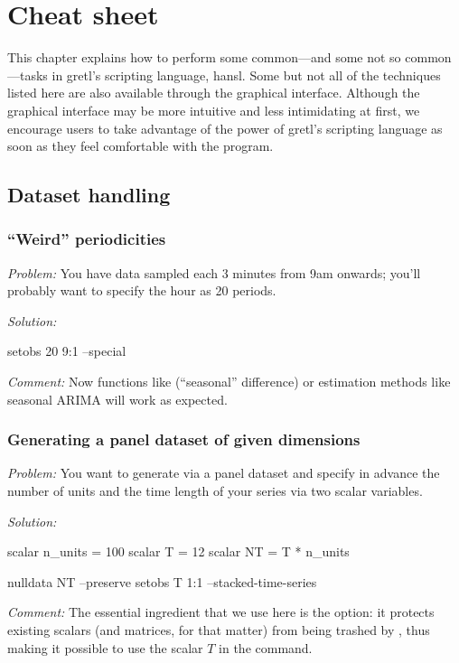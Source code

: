 \chapter{Cheat sheet}
\label{chap:cheatsheet}

This chapter explains how to perform some common---and some not so
common---tasks in gretl's scripting language, hansl.  Some but not
all of the techniques listed here are also available through the
graphical interface.  Although the graphical interface may be more
intuitive and less intimidating at first, we encourage users to take
advantage of the power of gretl's scripting language as soon as
they feel comfortable with the program.

\section{Dataset handling}

\subsection{``Weird'' periodicities}

\emph{Problem:} You have data sampled each 3 minutes from 9am onwards;
you'll probably want to specify the hour as 20 periods.

\emph{Solution:}
\begin{code}
setobs 20 9:1 --special
\end{code}

\emph{Comment:} Now functions like  (``seasonal''
difference) or estimation methods like seasonal ARIMA will work as
expected.

\subsection{Generating a panel dataset of given dimensions}

\emph{Problem:} You want to generate via  a panel
dataset and specify in advance the number of units and the time length
of your series via two scalar variables.

\emph{Solution:}
\begin{code}
scalar n_units = 100
scalar T = 12
scalar NT = T * n_units

nulldata NT --preserve
setobs T 1:1 --stacked-time-series
\end{code}

\emph{Comment:} The essential ingredient that we use here is the
 option: it protects existing scalars (and matrices,
for that matter) from being trashed by , thus making it
possible to use the scalar $T$ in the  command.

